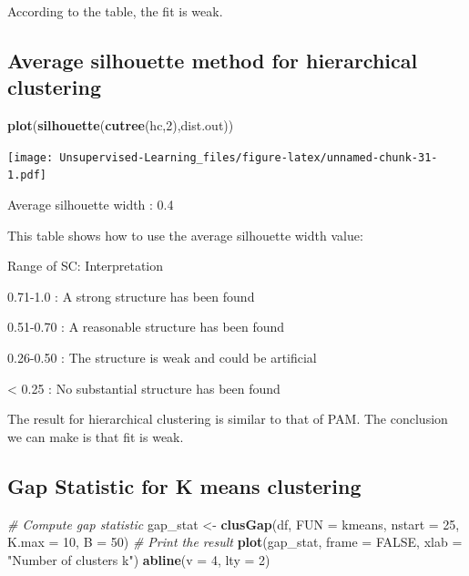 \documentclass[
]{book}
\newenvironment{Shaded}{\begin{snugshade}}{\end{snugshade}}
\newcommand{\CommentTok}[1]{\textcolor[rgb]{0.56,0.35,0.01}{\textit{#1}}}
\newcommand{\DataTypeTok}[1]{\textcolor[rgb]{0.13,0.29,0.53}{#1}}
\newcommand{\DecValTok}[1]{\textcolor[rgb]{0.00,0.00,0.81}{#1}}
\newcommand{\KeywordTok}[1]{\textcolor[rgb]{0.13,0.29,0.53}{\textbf{#1}}}
\newcommand{\NormalTok}[1]{#1}
\newcommand{\OtherTok}[1]{\textcolor[rgb]{0.56,0.35,0.01}{#1}}
\newcommand{\StringTok}[1]{\textcolor[rgb]{0.31,0.60,0.02}{#1}}
\begin{document}
According to the table, the fit is weak.

\hypertarget{average-silhouette-method-for-hierarchical-clustering}{%
\subsection{Average silhouette method for hierarchical clustering}\label{average-silhouette-method-for-hierarchical-clustering}}

\begin{Shaded}
\begin{Highlighting}[]
\KeywordTok{plot}\NormalTok{(}\KeywordTok{silhouette}\NormalTok{(}\KeywordTok{cutree}\NormalTok{(hc,}\DecValTok{2}\NormalTok{),dist.out))}
\end{Highlighting}
\end{Shaded}

\texttt{[image: Unsupervised-Learning\_files/figure-latex/unnamed-chunk-31-1.pdf]}

Average silhouette width : 0.4

This table shows how to use the average silhouette width value:

Range of SC: Interpretation

0.71-1.0 : A strong structure has been found

0.51-0.70 : A reasonable structure has been found

0.26-0.50 : The structure is weak and could be artificial

\textless{} 0.25 : No substantial structure has been found

The result for hierarchical clustering is similar to that of PAM. The conclusion we can make is that fit is weak.

\hypertarget{gap-statistic-for-k-means-clustering}{%
\subsection{Gap Statistic for K means clustering}\label{gap-statistic-for-k-means-clustering}}

\begin{Shaded}
\begin{Highlighting}[]
\CommentTok{# Compute gap statistic}
\NormalTok{gap_stat <-}\StringTok{ }\KeywordTok{clusGap}\NormalTok{(df, }\DataTypeTok{FUN =}\NormalTok{ kmeans, }\DataTypeTok{nstart =} \DecValTok{25}\NormalTok{, }\DataTypeTok{K.max =} \DecValTok{10}\NormalTok{, }\DataTypeTok{B =} \DecValTok{50}\NormalTok{)}
\CommentTok{# Print the result}
\KeywordTok{plot}\NormalTok{(gap_stat, }\DataTypeTok{frame =} \OtherTok{FALSE}\NormalTok{, }\DataTypeTok{xlab =} \StringTok{"Number of clusters k"}\NormalTok{)}
\KeywordTok{abline}\NormalTok{(}\DataTypeTok{v =} \DecValTok{4}\NormalTok{, }\DataTypeTok{lty =} \DecValTok{2}\NormalTok{)}
\end{Highlighting}
\end{Shaded}
\end{document}

